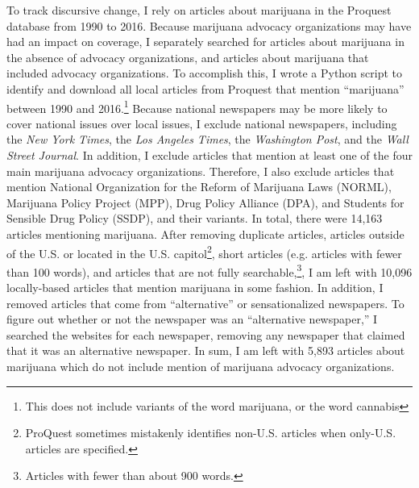 To track discursive change, I rely on articles about marijuana in the Proquest database from 1990 to 2016. Because marijuana advocacy organizations may have had an impact on coverage, I separately searched for articles about marijuana in the absence of advocacy organizations, and articles about marijuana that included advocacy organizations. To accomplish this,  I wrote a Python script to identify and download all local articles from Proquest that mention ``marijuana'' between 1990 and 2016.\footnote{This does not include variants of the word marijuana, or the word cannabis} Because national newspapers may be more likely to cover national issues over local issues, I exclude national newspapers, including the \textit{New York Times}, the \textit{Los Angeles Times}, the \textit{Washington Post}, and the \textit{Wall Street Journal}. In addition, I exclude articles that mention at least one of the four main marijuana advocacy organizations. Therefore, I also exclude articles that mention National Organization for the Reform of Marijuana Laws (NORML), Marijuana Policy Project (MPP), Drug Policy Alliance (DPA), and Students for Sensible Drug Policy (SSDP), and their variants. In total, there were 14,163 articles mentioning marijuana. After removing duplicate articles, articles outside of the U.S. or located in the U.S. capitol\footnote{ProQuest sometimes mistakenly identifies non-U.S. articles when only-U.S. articles are specified.}, short articles (e.g. articles with fewer than 100 words), and articles that are not fully searchable,\footnote{Articles with fewer than about 900 words.}, I am left with 10,096 locally-based articles that mention marijuana in some fashion. In addition, I removed articles that come from ``alternative'' or sensationalized newspapers. To figure out whether or not the newspaper was an ``alternative newspaper,'' I searched the websites for each newspaper, removing any newspaper that claimed that it was an alternative newspaper. In sum, I am left with  5,893 articles about marijuana which do not include mention of marijuana advocacy organizations. %


